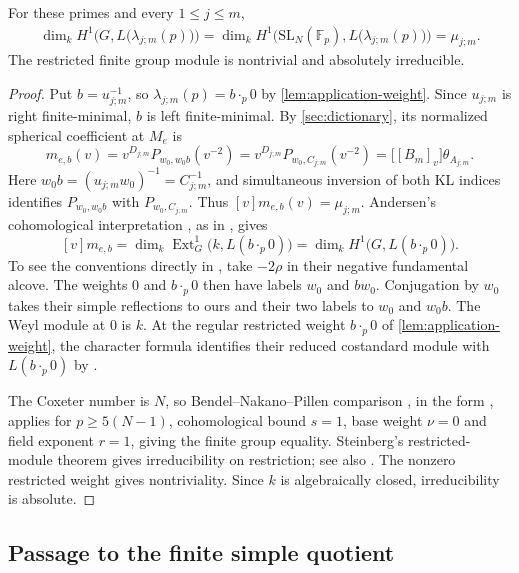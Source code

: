 \documentclass[a4paper,11pt]{amsart}
\numberwithin{equation}{subsection}
\theoremstyle{plain}
\theoremstyle{definition}
\theoremstyle{remark}
\begin{document}
\begin{lemma}\label{prop:application-transfer}
For these primes and every $1\le j\le m$,
\begin{gather*}
\dim_k H^1\Big(G,L\big(\lambda_{j;m}(p)\big)\Big)
=\dim_k H^1\Big(\mathrm{SL}_N(\mathbb F_p),L\big(\lambda_{j;m}(p)\big)\Big)
=\mu_{j;m}.
\end{gather*}
The restricted finite group module is nontrivial and absolutely
irreducible.
\end{lemma}

\begin{proof}
Put $b=u_{j;m}^{-1}$, so $\lambda_{j;m}(p)=b\cdot_p0$ by
\autoref{lem:application-weight}. Since $u_{j;m}$ is right
finite-minimal, $b$ is left finite-minimal.
By \autoref{sec:dictionary}, its normalized spherical
coefficient at $M_e$ is
\[
m_{e,b}(v)=v^{D_{j;m}}P_{w_0,w_0b}(v^{-2})
=v^{D_{j;m}}P_{w_0,C_{j;m}}(v^{-2})
=\big[[B_m]_v\big]\theta_{A_{j;m}}.
\]
Here $w_0b=(u_{j;m}w_0)^{-1}=C_{j;m}^{-1}$,
and simultaneous inversion of both KL indices identifies
$P_{w_0,w_0b}$ with $P_{w_0,C_{j;m}}$.
Thus $[v]m_{e,b}(v)=\mu_{j;m}$.
Andersen's cohomological interpretation \cite{Andersen}, as in
\cite[Theorem~4.5]{Luebeck}, gives
\[
[v]m_{e,b}=\dim_k\operatorname{Ext}^1_{G}\big(k,L(b\cdot_p0)\big)
=\dim_k H^1\big(G,L(b\cdot_p0)\big).
\]
To see the conventions directly in
\cite[Theorems~5.4(b) and~6.8(a)]{CPS}, take $-2\rho$ in their
negative fundamental alcove. The weights $0$ and $b\cdot_p0$ then
have labels $w_0$ and $bw_0$. Conjugation by $w_0$ takes their
simple reflections to ours and their two labels to $w_0$ and $w_0b$.
The Weyl module at $0$ is $k$. At the regular restricted weight
$b\cdot_p0$ of \autoref{lem:application-weight}, the character formula
identifies their reduced costandard module with $L(b\cdot_p0)$
by \cite[(1.5.6)]{CPS}.

The Coxeter number is $N$, so Bendel--Nakano--Pillen comparison
\cite[Theorem~7.5]{BNP}, in the form \cite[Theorem~4.6]{Luebeck},
applies for $p\ge5(N-1)$, cohomological bound $s=1$, base weight
$\nu=0$ and field exponent $r=1$, giving the finite group equality.
Steinberg's restricted-module theorem
\cite[Theorems~1.3, 6.1 and 7.4]{Steinberg} gives irreducibility on
restriction; see also \cite[Proposition~5.3]{Luebeck}.
The nonzero restricted weight gives nontriviality.
Since $k$ is algebraically closed, irreducibility is absolute.
\end{proof}

\subsection{Passage to the finite simple quotient}
\end{document}
